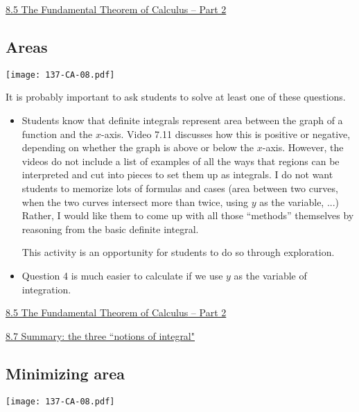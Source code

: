 \documentclass[11pt]{article}
\newcommand{\nl}{\hfill \vspace{-1.1\baselineskip}} %
\newcommand{\vv}{\hspace{8mm} \href{https://www.youtube.com/watch?v=OKw2v0DOXOI&list=PLlwePzQY_wW_8-sITAbG_GU2JgiuwXkDN&index=5}{8.5 The Fundamental Theorem of Calculus -- Part 2}}
\newcommand{\vvii}{\hspace{8mm} \href{https://www.youtube.com/watch?v=LBhvzrRyAtk&list=PLlwePzQY_wW_8-sITAbG_GU2JgiuwXkDN&index=7}{8.7 Summary: the three ``notions of integral"}}
\begin{document}
\begin{videos}
\vv
\end{videos}

\newpage
\subsection{Areas}

\begin{center}
{ \texttt{[image: 137-CA-08.pdf]}} 
\end{center}

\begin{warning}
	It is probably important to ask students to solve at least one of these questions.
\end{warning}

\begin{comments}
\nl
	\begin{itemize}
		\item Students know that definite integrals represent area between the graph of a function and the $x$-axis.  Video 7.11 discusses how this is positive or negative, depending on whether the graph is above or below the $x$-axis.  However, the videos do not include a list of examples of all the ways that regions can be interpreted and cut into pieces to set them up as integrals.  I do not want students to memorize lots of formulas and cases (area between two curves, when the two curves intersect more than twice, using $y$ as the variable, ...)  Rather, I would like them to come up with all those ``methods'' themselves by reasoning from the basic definite integral.
		
		This activity is an opportunity for students to do so through exploration.
		
		\item Question 4 is much easier to calculate if we use $y$ as the variable of integration.
	\end{itemize}
\end{comments}

\begin{videos}
\vv

\vvii
\end{videos}

\newpage
\subsection{Minimizing area}

\begin{center}
{ \texttt{[image: 137-CA-08.pdf]}} 
\end{center}
\end{document}
